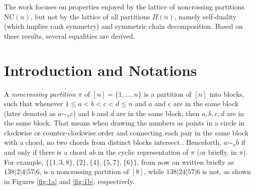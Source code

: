 The work focuses on properties enjoyed by the lattice of noncrossing partitions $\text{NC}(n)$, but not by the lattice of all partitions $\Pi(n)$, namely self-duality (which implies rank symmetry) and symmetric chain decomposition. Based on these results, several equalities are derived.

\section{Introduction and Notations}

A \textit{noncrossing partition} $\pi$ of $[n]=\{1,\ldots,n\}$ is a partition of $[n]$ into blocks, such that whenever $1\le a<b<c<d\le n$ and $a$ and $c$ are in the same block (later denoted as $a\sim_{\pi} c$) and $b$ and $d$ are in the same block, then $a,b,c,d$ are in the same block. That means when drawing the numbers as points in a circle in clockwise or counter-clockwise order and connecting each pair in the same block with a chord, no two chords from distinct blocks intersect.. Henceforth, $a\sim_\pi b$ if and only if there is a chord $ab$ in the cyclic representation of $\pi$ (or briefly, in $\pi$). For example, $\{\{1,3,8\},\{2\},\{4\}, \{5,7\},\{6\}\}$, from now on written briefly as $138|2|4|57|6$, is a noncrossing partition of $[8]$, while $138|24|57|6$ is not, as shown in Figures \ref{fig:1a} and \ref{fig:1b}, respectively.


